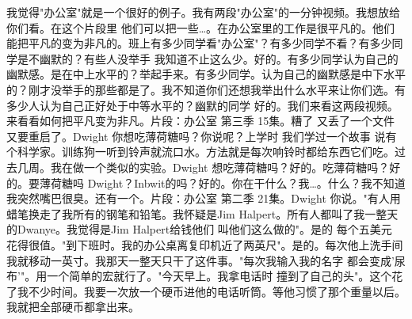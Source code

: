 我觉得"办公室"就是一个很好的例子。我有两段"办公室"的一分钟视频。我想放给你们看。在这个片段里 他们可以把一些…。在办公室里的工作是很平凡的。他们能把平凡的变为非凡的。班上有多少同学看"办公室"？有多少同学不看？有多少同学是不幽默的？有些人没举手 我知道不止这么少。好的。有多少同学认为自己的幽默感。是在中上水平的？举起手来。有多少同学。认为自己的幽默感是中下水平的？刚才没举手的那些都是了。我不知道你们还想我举出什么水平来让你们选。有多少人认为自己正好处于中等水平的？幽默的同学 好的。我们来看这两段视频。来看看如何把平凡变为非凡。片段：办公室 第三季 15集。糟了 又丢了一个文件 又要重启了。Dwight 你想吃薄荷糖吗？你说呢？上学时 我们学过一个故事 说有个科学家。训练狗一听到铃声就流口水。方法就是每次响铃时都给东西它们吃。过去几周。我在做一个类似的实验。Dwight 想吃薄荷糖吗？好的。吃薄荷糖吗？好的。要薄荷糖吗 Dwight？Inbwit的吗？好的。你在干什么？我…。什么？我不知道 我突然嘴巴很臭。还有一个。片段：办公室 第二季 21集。Dwight 你说。"有人用蜡笔换走了我所有的钢笔和铅笔。我怀疑是Jim Halpert。所有人都叫了我一整天的Dwanye。我觉得是Jim Halpert给钱他们 叫他们这么做的"。是的 每个五美元 花得很值。"到下班时。我的办公桌离复印机近了两英尺"。是的。每次他上洗手间 我就移动一英寸。我那天一整天只干了这件事。"每次我输入我的名字 都会变成'尿布'"。用一个简单的宏就行了。"今天早上。我拿电话时 撞到了自己的头"。这个花了我不少时间。我要一次放一个硬币进他的电话听筒。等他习惯了那个重量以后。我就把全部硬币都拿出来。 

